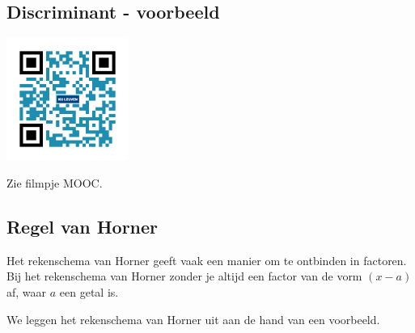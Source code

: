 \subsection{Discriminant - voorbeeld}
\begin{minipage}{.25\linewidth}
	\raggedright
	\includegraphics[width=4cm]{1_elem_rekenvaardigheden_A/inputs/QR_Code_DISCRIMINANT_module1}
\end{minipage}
\begin{minipage}{.7\linewidth}
	Zie filmpje MOOC.
\end{minipage}

\subsection{Regel van Horner}

\begin{eigenschap}
	Het rekenschema van Horner geeft vaak een manier om te ontbinden in factoren. Bij het rekenschema van Horner zonder je altijd een factor van de vorm $(x-a)$ af, waar $a$ een getal is.
\end{eigenschap}

We leggen het rekenschema van Horner uit aan de hand van een voorbeeld.

